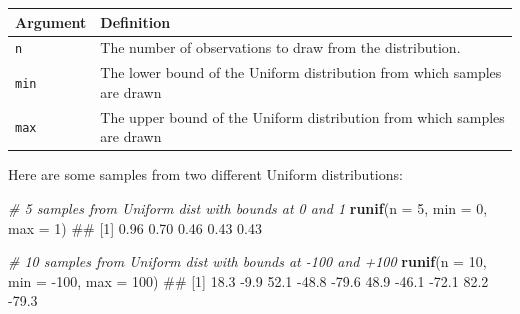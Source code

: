 \documentclass[]{book}
\newenvironment{Shaded}{\begin{snugshade}}{\end{snugshade}}
\newcommand{\KeywordTok}[1]{\textcolor[rgb]{0.13,0.29,0.53}{\textbf{{#1}}}}
\newcommand{\DataTypeTok}[1]{\textcolor[rgb]{0.13,0.29,0.53}{{#1}}}
\newcommand{\DecValTok}[1]{\textcolor[rgb]{0.00,0.00,0.81}{{#1}}}
\newcommand{\CommentTok}[1]{\textcolor[rgb]{0.56,0.35,0.01}{\textit{{#1}}}}
\newcommand{\NormalTok}[1]{{#1}}
\theoremstyle{definition}
\theoremstyle{definition}
\theoremstyle{remark}
\begin{document}
\begin{longtable}[]{@{}ll@{}}
\toprule
\begin{minipage}[b]{0.14\columnwidth}\raggedright\strut
Argument\strut
\end{minipage} & \begin{minipage}[b]{0.61\columnwidth}\raggedright\strut
Definition\strut
\end{minipage}\tabularnewline
\midrule
\endhead
\begin{minipage}[t]{0.14\columnwidth}\raggedright\strut
\texttt{n}\strut
\end{minipage} & \begin{minipage}[t]{0.61\columnwidth}\raggedright\strut
The number of observations to draw from the distribution.\strut
\end{minipage}\tabularnewline
\begin{minipage}[t]{0.14\columnwidth}\raggedright\strut
\texttt{min}\strut
\end{minipage} & \begin{minipage}[t]{0.61\columnwidth}\raggedright\strut
The lower bound of the Uniform distribution from which samples are
drawn\strut
\end{minipage}\tabularnewline
\begin{minipage}[t]{0.14\columnwidth}\raggedright\strut
\texttt{max}\strut
\end{minipage} & \begin{minipage}[t]{0.61\columnwidth}\raggedright\strut
The upper bound of the Uniform distribution from which samples are
drawn\strut
\end{minipage}\tabularnewline
\bottomrule
\end{longtable}

Here are some samples from two different Uniform distributions:

\begin{Shaded}
\begin{Highlighting}[]
\CommentTok{# 5 samples from Uniform dist with bounds at 0 and 1}
\KeywordTok{runif}\NormalTok{(}\DataTypeTok{n =} \DecValTok{5}\NormalTok{, }\DataTypeTok{min =} \DecValTok{0}\NormalTok{, }\DataTypeTok{max =} \DecValTok{1}\NormalTok{)}
\NormalTok{## [1] 0.96 0.70 0.46 0.43 0.43}

\CommentTok{# 10 samples from Uniform dist with bounds at -100 and +100}
\KeywordTok{runif}\NormalTok{(}\DataTypeTok{n =} \DecValTok{10}\NormalTok{, }\DataTypeTok{min =} \NormalTok{-}\DecValTok{100}\NormalTok{, }\DataTypeTok{max =} \DecValTok{100}\NormalTok{)}
\NormalTok{##  [1]  18.3  -9.9  52.1 -48.8 -79.6  48.9 -46.1 -72.1  82.2 -79.3}
\end{Highlighting}
\end{Shaded}
\end{document}
